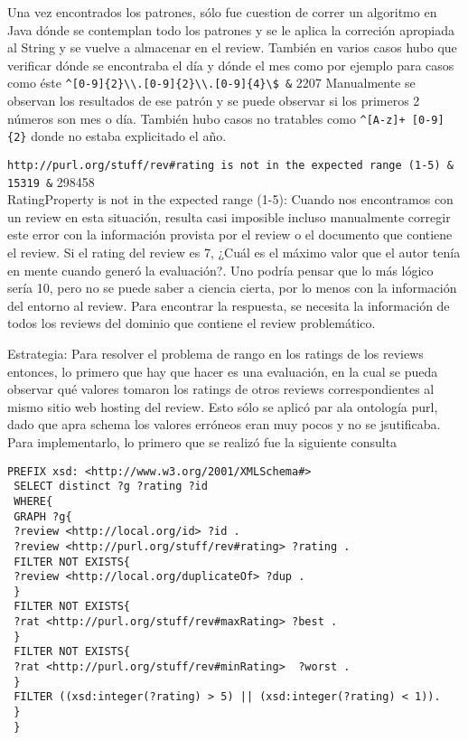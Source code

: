 Una vez encontrados los patrones, sólo fue cuestion de correr un algoritmo en Java dónde se contemplan todo los patrones y se 
le aplica la correción apropiada al String y se vuelve a almacenar en el review.
También en varios casos hubo que verificar dónde se encontraba el día y dónde el mes como por ejemplo para casos como éste 
\verb|^[0-9]{2}\\.[0-9]{2}\\.[0-9]{4}\$ &| 2207 
Manualmente se observan los resultados de ese patrón y se puede observar si los primeros 2 números son mes o día.
También hubo casos no tratables como \verb|^[A-z]+ [0-9]{2}| donde no estaba explicitado el año.

\verb|http://purl.org/stuff/rev#rating is not in the expected range (1-5) & 15319 &| 298458\\


{RatingProperty} is not in the expected range (1-5):
Cuando nos encontramos con un review en esta situación, resulta casi imposible incluso manualmente corregir este error con la información 
provista por el review o el documento que contiene el review. Si el rating del review es 7, ¿Cuál es el máximo valor que el autor tenía en mente cuando  
generó la evaluación?. Uno podría pensar que lo más lógico sería 10, pero no se puede saber a ciencia cierta, por lo menos con la información del entorno al review.
Para encontrar la respuesta, se necesita la información de todos los reviews del dominio que contiene el review problemático. 

Estrategia:
Para resolver el problema de rango en los ratings de los reviews entonces, lo primero que hay que hacer es una evaluación, en la cual 
se pueda observar qué valores tomaron los ratings de otros reviews correspondientes al mismo sitio web hosting del review. 
Esto sólo se aplicó par ala ontología purl, dado que apra schema los valores erróneos eran muy pocos y no se jsutificaba.
Para implementarlo, lo primero que se realizó fue la siguiente consulta

\begin{lstlisting}[frame=single]
 PREFIX xsd: <http://www.w3.org/2001/XMLSchema#> 
 SELECT distinct ?g ?rating ?id 
 WHERE{
 GRAPH ?g{
 ?review <http://local.org/id> ?id .
 ?review <http://purl.org/stuff/rev#rating> ?rating .
 FILTER NOT EXISTS{
 ?review <http://local.org/duplicateOf> ?dup .
 }
 FILTER NOT EXISTS{
 ?rat <http://purl.org/stuff/rev#maxRating> ?best .
 }
 FILTER NOT EXISTS{
 ?rat <http://purl.org/stuff/rev#minRating>  ?worst .
 }
 FILTER ((xsd:integer(?rating) > 5) || (xsd:integer(?rating) < 1)).
 }
 }
\end{lstlisting}

